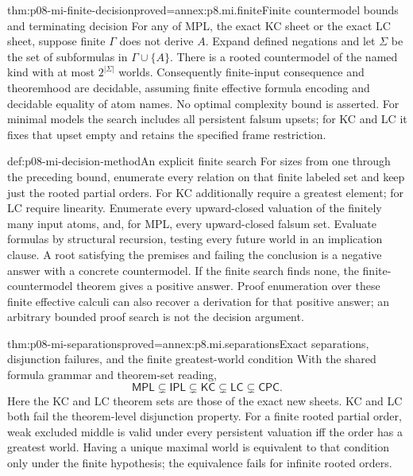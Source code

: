 \begin{hbtheorem}{thm:p08-mi-finite-decision}{proved=annex:p8.mi.finite}{Finite countermodel bounds and terminating decision}
For any of MPL, the exact KC sheet or the exact LC sheet, suppose finite
\(\Gamma\) does not derive \(A\). Expand defined negations and let
\(\Sigma\) be the set of subformulas in \(\Gamma\cup\{A\}\).
There is a rooted countermodel of the named kind with at most
\(2^{|\Sigma|}\) worlds. Consequently finite-input consequence and
theoremhood are decidable, assuming finite effective formula encoding and
decidable equality of atom names. No optimal complexity bound is asserted.
For minimal models the search includes all persistent falsum upsets;
for KC and LC it fixes that upset empty and retains the specified frame
restriction.
\end{hbtheorem}

\begin{hbmethod}{def:p08-mi-decision-method}{An explicit finite search}
For sizes from one through the preceding bound, enumerate every relation
on that finite labeled set and keep just the rooted partial orders.
For KC additionally require a greatest element; for LC require linearity.
Enumerate every upward-closed valuation of the finitely many input atoms,
and, for MPL, every upward-closed falsum set. Evaluate formulas by
structural recursion, testing every future world in an implication clause.
A root satisfying the premises and failing the conclusion is a negative
answer with a concrete countermodel. If the finite search finds none, the
finite-countermodel theorem gives a positive answer. Proof enumeration
over these finite effective calculi can also recover a derivation for
that positive answer; an arbitrary bounded proof search is not the
decision argument.
\end{hbmethod}

\begin{hbtheorem}{thm:p08-mi-separations}{proved=annex:p8.mi.separations}{Exact separations, disjunction failures, and the finite greatest-world condition}
With the shared formula grammar and theorem-set reading,
\[
 \mathsf{MPL}\subsetneq\mathsf{IPL}\subsetneq
 \mathsf{KC}\subsetneq\mathsf{LC}\subsetneq\mathsf{CPC}.
\]
Here the KC and LC theorem sets are those of the exact new sheets.
KC and LC both fail the theorem-level disjunction property.
For a finite rooted partial order, weak excluded middle is valid under
every persistent valuation iff the order has a greatest world.
Having a unique maximal world is equivalent to that condition only under
the finite hypothesis; the equivalence fails for infinite rooted orders.
\end{hbtheorem}

